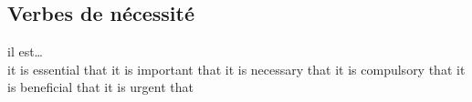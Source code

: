 \subsection*{Verbes de nécessité}
il est\ldots\\
   {it is essential that}
   {it is important that}
   {it is necessary that}
   {it is compulsory that}
    {it is beneficial that}
   {it is urgent that}
